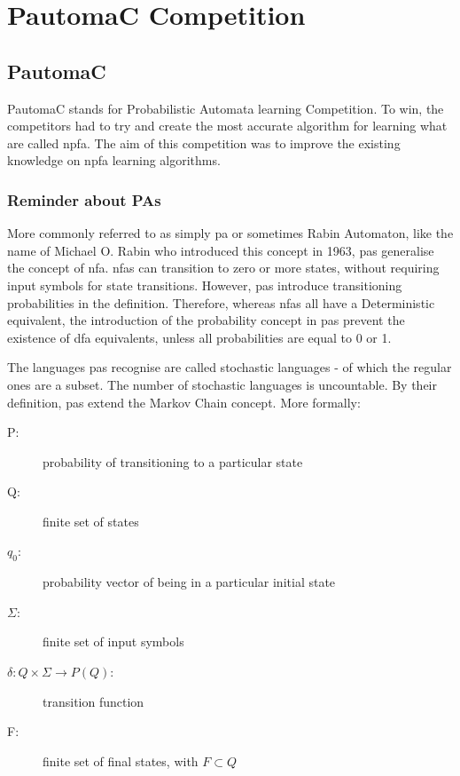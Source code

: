 \section{PautomaC Competition}

\subsection{PautomaC}

PautomaC stands for Probabilistic Automata learning Competition. To
win, the competitors had to try and create the most accurate algorithm
for learning what are called \gls{npfa}. The aim of this competition was to improve
the existing knowledge on \gls{npfa} learning algorithms.


\subsubsection{Reminder about PAs}

More commonly referred to as simply \gls{pa} or
sometimes Rabin Automaton, like the name of Michael O. Rabin who introduced
this concept in 1963, \gls{pa}s generalise the concept of \gls{nfa}. \gls{nfa}s can transition to zero or more states,
without requiring input symbols for state transitions. However, \gls{pa}s
introduce transitioning probabilities in the definition. Therefore,
whereas \gls{nfa}s all have a Deterministic equivalent, the introduction
of the probability concept in \gls{pa}s prevent the existence of \gls{dfa} equivalents,
unless all probabilities are equal to 0 or 1.

The languages \gls{pa}s recognise are called stochastic languages \cite{macarie} - of which
the regular ones are a subset. The number of stochastic languages is uncountable.
By their definition, \gls{pa}s extend the Markov Chain concept. More formally:

\begin{description}
	\item [{P:}] probability of transitioning to a particular state
	\item [{Q:}] finite set of states
	\item [{$q_{0}$:}] probability vector of being in a particular initial
	state
	\item [{$\varSigma$:}] finite set of input symbols
	\item [{$\delta:Q\times\varSigma\longrightarrow P(Q)$:}] transition function
	\item [{F:}] finite set of final states, with $F\subset Q$
\end{description}

